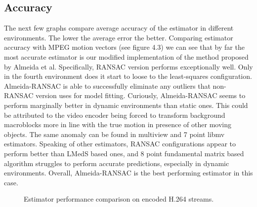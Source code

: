 \documentclass[11pt,english]{report}
\newcommand{\getstat}[1]{docs/statistics/#1}
\newcommand{\vidpic}[1]{
	\texttt{[image: docs/report/\#1]}
}
\newcommand{\statplot}[4]{
	\addplot[#3, mark = #4, thick, smooth, mark size = 2, mark options={fill=#3}] table [y=#2, col sep=comma] {\getstat{#1}};
}
\begin{document}
\subsection{Accuracy}

The next few graphs compare average accuracy of the estimator in different environments. The lower the average error the better. Comparing estimator accuracy with MPEG motion vectors (see figure 4.3) we can see that by far the most accurate estimator is our modified implementation of the method proposed by Almeida et al. Specifically, RANSAC version performs exceptionally well. Only in the fourth environment does it start to loose to the least-squares configuration. Almeida-RANSAC is able to successfully eliminate any outliers that non-RANSAC version uses for model fitting. Curiously, Almeida-RANSAC seems to perform marginally better in dynamic environments than static ones. This could be attributed to the video encoder being forced to transform background macroblocks more in line with the true motion in presence of other moving objects. The same anomaly can be found in multiview and 7 point libmv estimators. Speaking of other estimators, RANSAC configurations appear to perform better than LMedS based ones, and 8 point fundamental matrix based algorithm struggles to perform accurate predictions, especially in dynamic environments. Overall, Almeida-RANSAC is the best performing estimator in this case.

\begin{figure}[!ht]
\begin{center}
\end{center}
\caption{\centering Estimator performance comparison on encoded H.264 streams.}
\end{figure}
\end{document}
